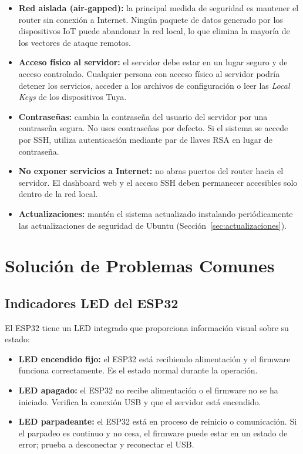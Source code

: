 \begin{itemize}
    \item \textbf{Red aislada (air-gapped):} la principal medida de seguridad es mantener el router sin conexión a Internet. Ningún paquete de datos generado por los dispositivos IoT puede abandonar la red local, lo que elimina la mayoría de los vectores de ataque remotos.
    \item \textbf{Acceso físico al servidor:} el servidor debe estar en un lugar seguro y de acceso controlado. Cualquier persona con acceso físico al servidor podría detener los servicios, acceder a los archivos de configuración o leer las \textit{Local Keys} de los dispositivos Tuya.
    \item \textbf{Contraseñas:} cambia la contraseña del usuario del servidor por una contraseña segura. No uses contraseñas por defecto. Si el sistema se accede por SSH, utiliza autenticación mediante par de llaves RSA en lugar de contraseña.
    \item \textbf{No exponer servicios a Internet:} no abras puertos del router hacia el servidor. El dashboard web y el acceso SSH deben permanecer accesibles solo dentro de la red local.
    \item \textbf{Actualizaciones:} mantén el sistema actualizado instalando periódicamente las actualizaciones de seguridad de Ubuntu (Sección~\ref{sec:actualizaciones}).
\end{itemize}

\section{Solución de Problemas Comunes}

\subsection{Indicadores LED del ESP32}

El ESP32 tiene un LED integrado que proporciona información visual sobre su estado:

\begin{itemize}
    \item \textbf{LED encendido fijo:} el ESP32 está recibiendo alimentación y el firmware funciona correctamente. Es el estado normal durante la operación.
    \item \textbf{LED apagado:} el ESP32 no recibe alimentación o el firmware no se ha iniciado. Verifica la conexión USB y que el servidor está encendido.
    \item \textbf{LED parpadeante:} el ESP32 está en proceso de reinicio o comunicación. Si el parpadeo es continuo y no cesa, el firmware puede estar en un estado de error; prueba a desconectar y reconectar el USB.
\end{itemize}

